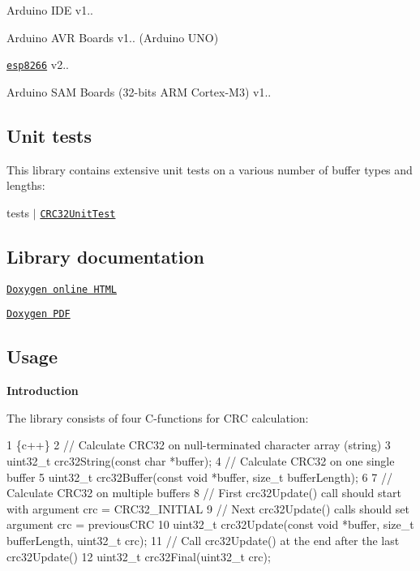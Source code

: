 \begin{DoxyItemize}
\item Arduino I\+DE v1..
\item Arduino A\+VR Boards v1.. (Arduino U\+NO)
\item \href{http://arduino.esp8266.com/stable/package_esp8266com_index.json}{\tt esp8266} v2..
\item Arduino S\+AM Boards (32-\/bits A\+RM Cortex-\/\+M3) v1..
\end{DoxyItemize}

\subsection*{Unit tests}

This library contains extensive unit tests on a various number of buffer types and lengths\+:


\begin{DoxyItemize}
\item tests $\vert$ \href{https://github.com/Erriez/ErriezCRC32/blob/master/tests/CRC32UnitTest/CRC32UnitTest.ino}{\tt C\+R\+C32\+Unit\+Test}
\end{DoxyItemize}

\subsection*{Library documentation}


\begin{DoxyItemize}
\item \href{https://erriez.github.io/ErriezCRC32}{\tt Doxygen online H\+T\+ML}
\item \href{https://github.com/Erriez/ErriezCRC32/raw/gh-pages/latex/ErriezCRC32.pdf}{\tt Doxygen P\+DF}
\end{DoxyItemize}

\subsection*{Usage}

{\bfseries Introduction}

The library consists of four C-\/functions for C\+RC calculation\+:


\begin{DoxyCode}
1 \{c++\}
2 // Calculate CRC32 on null-terminated character array (string)
3 uint32\_t crc32String(const char *buffer);
4 // Calculate CRC32 on one single buffer
5 uint32\_t crc32Buffer(const void *buffer, size\_t bufferLength);
6 
7 // Calculate CRC32 on multiple buffers
8 // First crc32Update() call should start with argument crc = CRC32\_INITIAL
9 // Next crc32Update() calls should set argument crc = previousCRC
10 uint32\_t crc32Update(const void *buffer, size\_t bufferLength, uint32\_t crc);
11 // Call crc32Update() at the end after the last crc32Update()
12 uint32\_t crc32Final(uint32\_t crc);
\end{DoxyCode}


